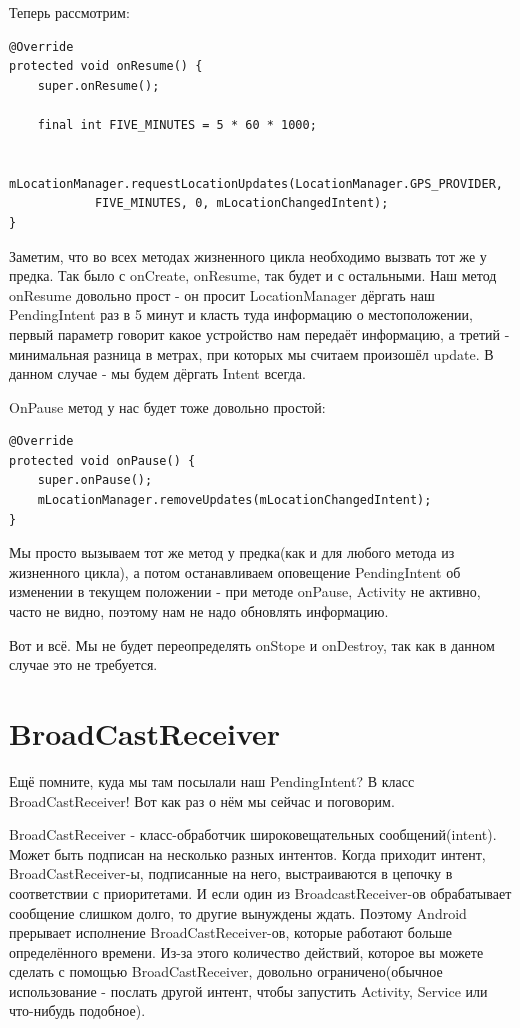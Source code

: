 \documentclass[12 pt]{article}
\begin{document}
     Теперь рассмотрим:
     
     \begin{lstlisting}
@Override
protected void onResume() {
    super.onResume();

    final int FIVE_MINUTES = 5 * 60 * 1000;

    mLocationManager.requestLocationUpdates(LocationManager.GPS_PROVIDER,
            FIVE_MINUTES, 0, mLocationChangedIntent);
}    
     \end{lstlisting}
    
    Заметим, что во всех методах жизненного цикла необходимо вызвать тот же у предка. Так было с onCreate, onResume, так будет и с остальными. Наш метод onResume довольно прост - он просит LocationManager дёргать наш PendingIntent раз в 5 минут и класть туда информацию о местоположении, первый параметр говорит какое устройство нам передаёт информацию, а третий - минимальная разница в метрах, при которых мы считаем произошёл update. В данном случае - мы будем дёргать Intent всегда.
    
    OnPause метод у нас будет тоже довольно простой:
    \begin{lstlisting}
@Override
protected void onPause() {
    super.onPause();
    mLocationManager.removeUpdates(mLocationChangedIntent);
} 
    \end{lstlisting}
    
    Мы просто вызываем тот же метод у предка(как и для любого метода из жизненного цикла), а потом останавливаем оповещение PendingIntent об изменении в текущем положении - при методе onPause, Activity не активно, часто не видно, поэтому нам не надо обновлять информацию.
    
    Вот и всё. Мы не будет переопределять onStope и onDestroy, так как в данном случае это не требуется.
\section{BroadCastReceiver} 
    Ещё помните, куда мы там посылали наш PendingIntent? В класс BroadCastReceiver! Вот как раз о нём мы сейчас и поговорим.
    
    BroadCastReceiver - класс-обработчик широковещательных сообщений(intent). Может быть подписан на несколько разных интентов. Когда приходит интент, BroadCastReceiver-ы, подписанные на него, выстраиваются в цепочку в соответствии с приоритетами. И если один из BroadcastReceiver-ов обрабатывает сообщение слишком долго, то другие вынуждены ждать. Поэтому Android прерывает исполнение BroadCastReceiver-ов, которые работают больше определённого времени. Из-за этого количество действий, которое вы можете сделать с помощью BroadCastReceiver, довольно ограничено(обычное использование - послать другой интент, чтобы запустить Activity, Service или что-нибудь подобное).
    
\end{document}
